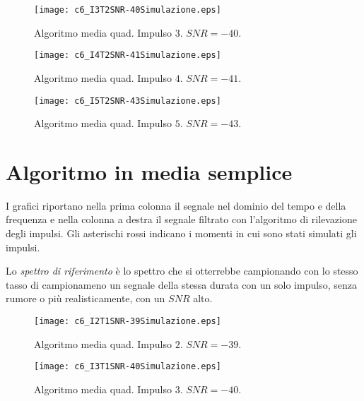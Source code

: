 \begin{figure}[tbp] 
\centering    
\texttt{[image: c6\_I3T2SNR-40Simulazione.eps]}
\caption[Algoritmo media quad. Impulso $3$. $SNR=-40$.]
{Algoritmo media quad. Impulso $3$. $SNR=-40$.}
\label{fig:c6_I3T2SNR-40Simulazione}
\end{figure}


\begin{figure}[tbp] 
\centering
\texttt{[image: c6\_I4T2SNR-41Simulazione.eps]}
\caption[Algoritmo media quad. Impulso $4$. $SNR=-41$.]
{Algoritmo media quad. Impulso $4$. $SNR=-41$.}
\label{fig:c6_I4T2SNR-41Simulazione}
\end{figure}


\begin{figure}[tbp] 
\centering    
\texttt{[image: c6\_I5T2SNR-43Simulazione.eps]}
\caption[Algoritmo media quad. Impulso $5$. $SNR=-43$.]
{Algoritmo media quad. Impulso $5$. $SNR=-43$.}
\label{fig:c6_I5T2SNR-43Simulazione}
\end{figure}



\pagebreak




\section{Algoritmo in media semplice}

I grafici riportano nella prima colonna il segnale nel dominio del tempo e della frequenza e nella colonna a destra il segnale filtrato con l'algoritmo di rilevazione degli impulsi. Gli asterischi rossi indicano i momenti in cui sono stati simulati gli impulsi.

Lo {\it spettro di riferimento} è lo spettro che si otterrebbe campionando con lo stesso tasso di campionameno un segnale della stessa durata con un solo impulso, senza rumore o più realisticamente, con un $SNR$ alto.


\begin{figure}[tbp] 
\centering    
\texttt{[image: c6\_I2T1SNR-39Simulazione.eps]}
\caption[Algoritmo media semplice. Impulso $2$. $SNR=-39$.]
{Algoritmo media quad. Impulso $2$. $SNR=-39$.}
\label{fig:c6_I2T1SNR-32Simulazione}
\end{figure}


\begin{figure}[tbp] 
\centering    
\texttt{[image: c6\_I3T1SNR-40Simulazione.eps]}
\caption[Algoritmo media semplice. Impulso $3$. $SNR=-40$.]
{Algoritmo media quad. Impulso $3$. $SNR=-40$.}
\label{fig:c6_I3T1SNR-40Simulazione}
\end{figure}


